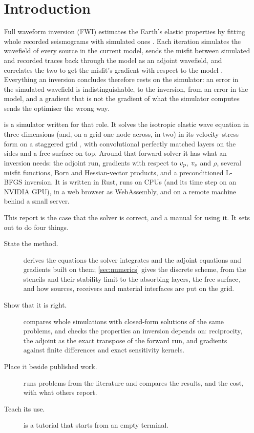 \section{Introduction}
\label{sec:intro}

Full waveform inversion (FWI) estimates the Earth's elastic properties by fitting whole
recorded seismograms with simulated ones \citep{tarantola1984,mora1987,fichtner2011}. Each
iteration simulates the wavefield of every source in the current model, sends the misfit
between simulated and recorded traces back through the model as an adjoint wavefield, and
correlates the two to get the misfit's gradient with respect to the model
\citep{tromp2005}. Everything an inversion concludes therefore rests on the simulator: an
error in the simulated wavefield is indistinguishable, to the inversion, from an error in
the model, and a gradient that is not the gradient of what the simulator computes sends the
optimiser the wrong way.

\vr{} is a simulator written for that role. It solves the isotropic elastic wave equation
in three dimensions (and, on a grid one node across, in two) in its velocity--stress form on
a staggered grid \citep{virieux1986,levander1988,graves1996}, with convolutional perfectly
matched layers on the sides \citep{komatitsch2007} and a free surface on top. Around that
forward solver it has what an inversion needs: the adjoint run, gradients with respect to
$v_p$, $v_s$ and $\rho$, several misfit functions, Born and Hessian-vector products, and a
preconditioned L-BFGS inversion. It is written in Rust, runs on CPUs (and its time step on an
NVIDIA GPU), in a web browser as WebAssembly, and on a remote machine behind a small server.

This report is the case that the solver is correct, and a manual for using it. It sets out
to do four things.

\begin{description}
  \item[State the method.]  derives the equations the solver integrates and
    the adjoint equations and gradients built on them; \cref{sec:numerics} gives the discrete
    scheme, from the stencils and their stability limit to the absorbing layers, the free
    surface, and how sources, receivers and material interfaces are put on the grid.
  \item[Show that it is right.]  compares whole simulations with
    closed-form solutions of the same problems, and checks the properties an inversion
    depends on: reciprocity, the adjoint as the exact transpose of the forward run, and
    gradients against finite differences and exact sensitivity kernels.
  \item[Place it beside published work.]  runs problems from the
    literature and compares the results, and the cost, with what others report.
  \item[Teach its use.]  is a tutorial that starts from an empty terminal.
\end{description}

